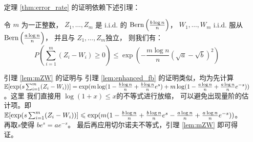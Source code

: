 定理 \ref{thm:error_rate} 的证明依赖下述引理：
\begin{lemma}\label{lem:mZW}
	令 $m$ 为一正整数，
	$Z_1, \dots, Z_m$
  是 i.i.d. 的 $\operatorname{Bern}\left(\frac{b \log n}{n}\right)$，
  $W_1, \dots, W_m$  i.i.d. 服从 $\operatorname{Bern}\left(\frac{a \log n}{n}\right)$，
  并且与 $Z_1, \dots, Z_m$独立，
	则我们有：
\begin{equation}
	P(\sum_{i=1}^m (Z_i  - W_i) \geq 0) \leq 
  \exp\left(-\frac{m \log n}{n} \left(\sqrt{a} - \sqrt{b} \right)^2 \right)
	\end{equation}
\end{lemma}
引理 \ref{lem:mZW} 的证明与
引理 \ref{lem:enhanced_fb} 的证明类似，均为先计算
$\operatorname{\mathbb{E}}[\exp(s \sum_{i=1}^m (Z_i - W_i))]
=\exp(m \log(1-\frac{b \log n}{n} + \frac{b \log n}{n} e^s) + m \log(1-\frac{a \log n}{n} + \frac{a \log n}{n} e^{-s}))$。这里
我们直接用 $\log(1+x)\leq x$的不等式进行放缩，
可以避免出现量阶的估计项。即
$\operatorname{\mathbb{E}}[\exp(s \sum_{i=1}^m (Z_i - W_i))]
\leqslant \exp(m(1-\frac{b \log n}{n} + \frac{b \log n}{n} e^s - \frac{a \log n}{n} + \frac{a \log n}{n} e^{-s}))$。
再取$s$使得 $be^s=ae^{-s}$。
最后再应用切尔诺夫不等式，引理 \ref{lem:mZW} 即可得证。

